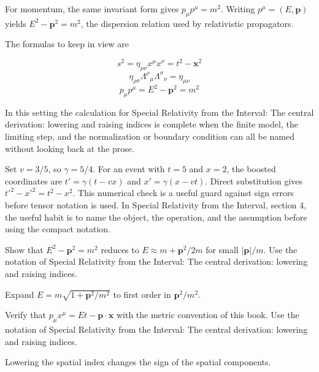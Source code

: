 For momentum, the same invariant form gives \(p_\mu p^\mu=m^2\).  Writing \(p^\mu=(E,\bm p)\) yields \(E^2-\bm p^2=m^2\), the dispersion relation used by relativistic propagators.

The formulas to keep in view are

\[
  s^2=\eta_{\mu\nu}x^\mu x^\nu=t^2-\bm x^2
\]
\[
  \eta_{\rho\sigma}\Lambda^\rho{}_\mu\Lambda^\sigma{}_\nu=\eta_{\mu\nu}
\]
\[
  p_\mu p^\mu=E^2-\bm p^2=m^2
\]

In this setting the calculation for Special Relativity from the Interval: The central derivation: lowering and raising indices is complete when the finite model, the limiting step, and the normalization or boundary condition can all be named without looking back at the prose.




\begin{example}
Set \(v=3/5\), so \(\gamma=5/4\).  For an event with \(t=5\) and \(x=2\), the boosted coordinates are \(t'=\gamma(t-vx)\) and \(x'=\gamma(x-vt)\).  Direct substitution gives \(t'^2-x'^2=t^2-x^2\).  This numerical check is a useful guard against sign errors before tensor notation is used.  In Special Relativity from the Interval, section 4, the useful habit is to name the object, the operation, and the assumption before using the compact notation.
\end{example}



\begin{exercise}
Show that \(E^2-\bm p^2=m^2\) reduces to \(E\approx m+\bm p^2/2m\) for small \(|\bm p|/m\).  Use the notation of Special Relativity from the Interval: The central derivation: lowering and raising indices.
\begin{answer}
Expand \(E=m\sqrt{1+\bm p^2/m^2}\) to first order in \(\bm p^2/m^2\).
\end{answer}
\end{exercise}

\begin{exercise}
Verify that \(p_\mu x^\mu=Et-\bm p\cdot\bm x\) with the metric convention of this book.  Use the notation of Special Relativity from the Interval: The central derivation: lowering and raising indices.
\begin{answer}
Lowering the spatial index changes the sign of the spatial components.
\end{answer}
\end{exercise}



